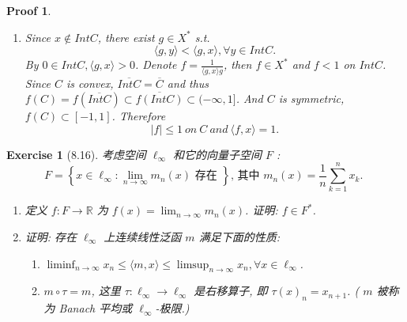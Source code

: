 \documentclass[hyperref,UTF8]{ctexart}
\newtheorem{ex}{Exercise}[section]
\newtheorem{pf}{Proof}[section]
\begin{document}
\begin{pf}
\begin{enumerate}
\begin{enumerate}
        \item \[\partial C = C\setminus (Int C) = (X\setminus \{x; p(x)>1\})\setminus\{x; p(x) < 1\} = \{x; p(x) = 1\}. \]
    \end{enumerate}
    \item Since $x\notin Int C$, there exist $g\in X^*$ s.t.
    \[ \langle g, y\rangle < \langle g, x\rangle, \forall y \in Int C. \]
    By $0\in Int C, \langle g, x\rangle > 0$. Denote $f = \frac1{\langle g, x\rangle g}$, then $f\in X^*$ and $f < 1$ on $Int C$. Since $C$ is convex, $\overline{Int C} = \overline C$ and thus $f(C) = f(\overline{Int C})\subset \overline{f(Int C)}\subset(-\infty, 1]$. And $C$ is symmetric, $f(C)\subset [-1, 1]$. Therefore
    \[ |f| \leq 1\ on\ C\ and \ \langle f, x\rangle = 1. \]
\end{enumerate}
    
\end{pf}

\begin{ex}[8.16]
    考虑空间 $\ell_{\infty}$ 和它的向量子空间 $F$ :
$$
F=\left\{x \in \ell_{\infty}: \lim _{n \rightarrow \infty} m_{n}(x) \text { 存在 }\right\} \text {, 其中 } m_{n}(x)=\frac{1}{n} \sum_{k=1}^{n} x_{k} \text {. }
$$
\begin{enumerate}
    \item 定义 $f: F \rightarrow \mathbb{R}$ 为 $f(x)=\lim _{n \rightarrow \infty} m_{n}(x)$. 证明: $f \in F^{*}$.
    \item 证明: 存在 $\ell_{\infty}$ 上连续线性泛函 $m$ 满足下面的性质:\begin{enumerate}
        \item $\liminf _{n \rightarrow \infty} x_{n} \leqslant \langle m, x\rangle  \leqslant \limsup _{n \rightarrow \infty} x_{n}, \forall x \in \ell_{\infty}$.
        \item $m \circ \tau=m$, 这里 $\tau: \ell_{\infty} \rightarrow \ell_{\infty}$ 是右移算子, 即 $\tau(x)_{n}=x_{n+1}$. ( $m$ 被称为 Banach 平均或 $\ell_{\infty}$-极限.)
    \end{enumerate}
\end{enumerate}
\end{ex}
\end{document}
